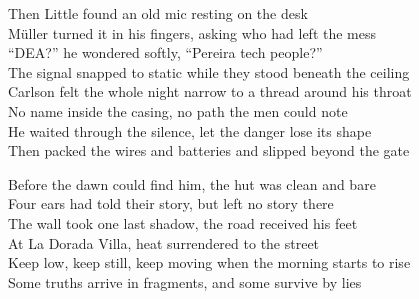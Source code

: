 \begin{lyrics}
Then Little found an old mic resting on the desk\\
Müller turned it in his fingers, asking who had left the mess\\
“DEA?” he wondered softly, “Pereira tech people?”\\
The signal snapped to static while they stood beneath the ceiling\\
Carlson felt the whole night narrow to a thread around his throat\\
No name inside the casing, no path the men could note\\
He waited through the silence, let the danger lose its shape\\
Then packed the wires and batteries and slipped beyond the gate

Before the dawn could find him, the hut was clean and bare\\
Four ears had told their story, but left no story there\\
The wall took one last shadow, the road received his feet\\
At La Dorada Villa, heat surrendered to the street\\
Keep low, keep still, keep moving when the morning starts to rise\\
Some truths arrive in fragments, and some survive by lies
\end{lyrics}
